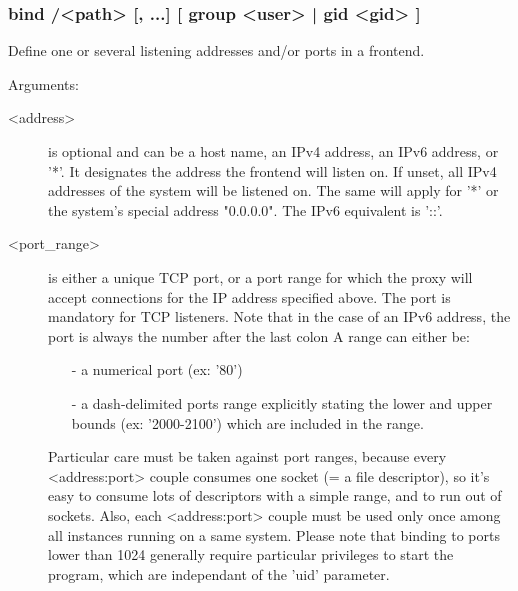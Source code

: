 \subsubsection*{bind /<path> [, ...] [ group <user> | gid <gid> ]}

  Define one or several listening addresses and/or ports in a frontend.
    
                                
  Arguments:
  \begin{description}
  \item[<address>]
                  is optional and can be a host name, an IPv4 address, an IPv6
                  address, or '*'. It designates the address the frontend will
                  listen on. If unset, all IPv4 addresses of the system will be
                  listened on. The same will apply for '*' or the system's
                  special address "0.0.0.0". The IPv6 equivalent is '::'.

  \item[<port\_range>]
                  is either a unique TCP port, or a port range for which the
                  proxy will accept connections for the IP address specified
                  above. The port is mandatory for TCP listeners. Note that in
                  the case of an IPv6 address, the port is always the number
                  after the last colon \chr{:} A range can either be:
                  
                  \begin{itemize}
                  \item[-] a numerical port (ex: '80')
                  \item[-] a dash-delimited ports range explicitly stating the lower
                     and upper bounds (ex: '2000-2100') which are included in
                     the range.
                  \end{itemize}

                  Particular care must be taken against port ranges, because
                  every <address:port> couple consumes one socket (= a file
                  descriptor), so it's easy to consume lots of descriptors
                  with a simple range, and to run out of sockets. Also, each
                  <address:port> couple must be used only once among all
                  instances running on a same system. Please note that binding
                  to ports lower than 1024 generally require particular
                  privileges to start the program, which are independant of
                  the 'uid' parameter.


\end{description}
